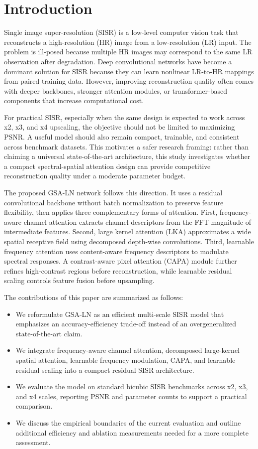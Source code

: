 \documentclass[conference]{IEEEtran}
\begin{document}
\section{Introduction}

Single image super-resolution (SISR) is a low-level computer vision task that reconstructs a high-resolution (HR) image from a low-resolution (LR) input. The problem is ill-posed because multiple HR images may correspond to the same LR observation after degradation. Deep convolutional networks have become a dominant solution for SISR because they can learn nonlinear LR-to-HR mappings from paired training data. However, improving reconstruction quality often comes with deeper backbones, stronger attention modules, or transformer-based components that increase computational cost.

For practical SISR, especially when the same design is expected to work across x2, x3, and x4 upscaling, the objective should not be limited to maximizing PSNR. A useful model should also remain compact, trainable, and consistent across benchmark datasets. This motivates a safer research framing: rather than claiming a universal state-of-the-art architecture, this study investigates whether a compact spectral-spatial attention design can provide competitive reconstruction quality under a moderate parameter budget.

The proposed GSA-LN network follows this direction. It uses a residual convolutional backbone without batch normalization to preserve feature flexibility, then applies three complementary forms of attention. First, frequency-aware channel attention extracts channel descriptors from the FFT magnitude of intermediate features. Second, large kernel attention (LKA) approximates a wide spatial receptive field using decomposed depth-wise convolutions. Third, learnable frequency attention uses content-aware frequency descriptors to modulate spectral responses. A contrast-aware pixel attention (CAPA) module further refines high-contrast regions before reconstruction, while learnable residual scaling controls feature fusion before upsampling.

The contributions of this paper are summarized as follows:
\begin{itemize}
    \item We reformulate GSA-LN as an efficient multi-scale SISR model that emphasizes an accuracy-efficiency trade-off instead of an overgeneralized state-of-the-art claim.
    \item We integrate frequency-aware channel attention, decomposed large-kernel spatial attention, learnable frequency modulation, CAPA, and learnable residual scaling into a compact residual SISR architecture.
    \item We evaluate the model on standard bicubic SISR benchmarks across x2, x3, and x4 scales, reporting PSNR and parameter counts to support a practical comparison.
    \item We discuss the empirical boundaries of the current evaluation and outline additional efficiency and ablation measurements needed for a more complete assessment.
\end{itemize}
\end{document}
